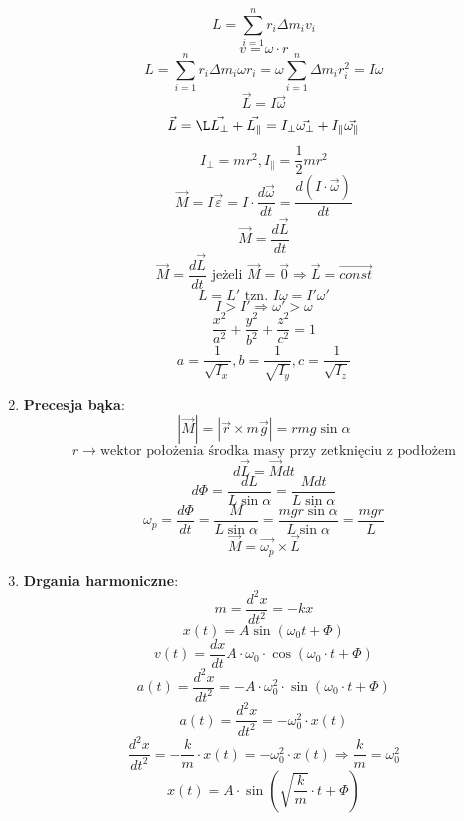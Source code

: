 \documentclass{article}
\begin{document}
\begin{enumerate}
\[		L = \sum\limits_{i = 1}^n r_i \Delta m_i v_i
		\]
		\[
		v = \omega \cdot r
		\]
		\[
		L = \sum\limits_{i = 1}^n r_i \Delta m_i \omega r_i = \omega \sum\limits_{i = 1}^n \Delta m_i r_i^2 = I \omega
		\]
		\[
		\vec{L} = I \vec{\omega}
		\]
		\[
		\vec{L} = \L\vec{L_{\perp}} + \vec{L_{\parallel}} = I_{\perp} \vec{\omega_{\perp}} + I_{\parallel} \vec{\omega_{\parallel}}
		\]
		\[
		I_{\perp} = mr^2, I_{\parallel} = \frac{1}{2} mr^2
		\]
		\[
		\vec{M} = I \vec{\varepsilon} = I \cdot \frac{d \vec{\omega}}{dt} = \frac{d(I \cdot \vec{\omega})}{dt}
		\]
		\[
		\vec{M} = \frac{d \vec{L}}{dt}
		\]
		\[
		\vec{M} = \frac{d \vec{L}}{dt} \text{ jeżeli } \vec{M} = \vec{0} \Rightarrow \vec{L} = \overrightarrow{const}
		\]
		\[
		L = L' \text{ tzn. } I \omega = I' \omega '
		\]
		\[
		I > I' \Rightarrow \omega ' > \omega
		\]
		\[
		\frac{x^2}{a^2} + \frac{y^2}{b^2} + \frac{z^2}{c^2} = 1
		\]
		\[
		a = \frac{1}{\sqrt{I_x}}, b = \frac{1}{\sqrt{I_y}}, c = \frac{1}{\sqrt{I_z}}
		\]
		\item \textbf{Precesja bąka}:
		\[
		| \vec{M} | = | \vec{r} \times m \vec{g} | = rmg \sin \alpha
		\]
		\[
		r \longrightarrow \text{wektor położenia środka masy przy zetknięciu z podłożem}
		\]
		\[
		d \vec{L} = \vec{M} dt
		\]
		\[
		d \varPhi = \frac{dL}{L \sin\alpha} = \frac{Mdt}{L \sin \alpha}
		\]
		\[
		\omega_p = \frac{d \varPhi}{dt} = \frac{M}{L \sin \alpha} = \frac{mgr \sin \alpha}{L \sin \alpha} = \frac{mgr}{L}
		\]
		\[
		\vec{M} = \vec{\omega_p} \times \vec{L}
		\]
		\item \textbf{Drgania harmoniczne}:
		\[
		m = \frac{d^2x}{dt^2} = -kx
		\]
		\[
		x(t) = A \sin (\omega_0t + \varPhi)
		\]
		\newline
		\[
		v(t) = \frac{dx}{dt} A \cdot \omega_0 \cdot \cos(\omega_0 \cdot t + \varPhi)
		\]
		\[
		a(t) = \frac{d^2 x}{dt^2} = -A \cdot \omega_0^2 \cdot \sin(\omega_0 \cdot t + \varPhi)
		\]
		\[
		a(t) = \frac{d^2x}{dt^2} = -\omega_0^2 \cdot x(t)
		\]
		\[
		\frac{d^2 x}{dt^2} = - \frac{k}{m} \cdot x(t) = - \omega^2_0 \cdot x(t) \Rightarrow \frac{k}{m} = \omega_0^2
		\]
		\[
		x(t) = A \cdot \sin \left(\sqrt{\frac{k}{m}} \cdot t + \varPhi \right)
		\]

\end{enumerate}
\end{document}
